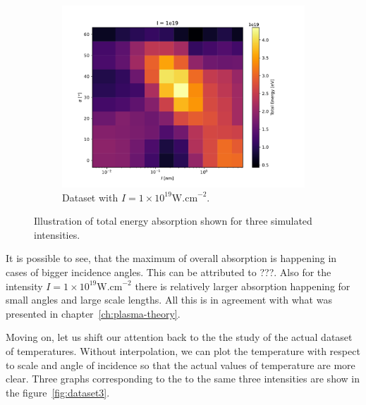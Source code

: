 \begin{figure}[ht]
\begin{subfigure}{0.49\textwidth}
		\centering
		\includegraphics[width=\textwidth]{figures/I_1e19_cut_10}
		\caption{Dataset with $I = 1 \times 10^{19} \mathrm{W.cm}^{-2}$.}
		\label{fig:dataset2-c}
	\end{subfigure}
	\caption{Illustration of total energy absorption shown for three simulated intensities.}
	\label{fig:dataset2}
\end{figure}

It is possible to see, that the maximum of overall absorption is happening in cases of bigger incidence angles. This can be attributed to ???. Also for the intensity $I = 1 \times 10^{19} \mathrm{W.cm}^{-2}$ there is relatively larger absorption happening for small angles and large scale lengths. All this is in agreement with what was presented in chapter~\ref{ch:plasma-theory}.

Moving on, let us shift our attention back to the the study of the actual dataset of temperatures. Without interpolation, we can plot the temperature with respect to scale and angle of incidence so that the actual values of temperature are more clear. Three graphs corresponding to the to the same three intensities are show in the figure~\ref{fig:dataset3}.

